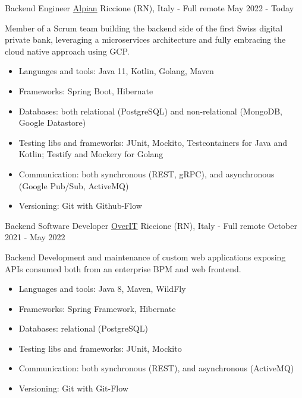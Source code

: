 

\begin{cventries}
	
\cventry
{Backend Engineer} %
{\href{https://alpian.com/}{Alpian}} %
{Riccione (RN), Italy - Full remote} %
{May 2022 - Today} %
{
	Member of a Scrum team building the backend side of the first Swiss digital private bank, leveraging a microservices architecture and fully embracing the cloud native approach using GCP.
	\begin{itemize}
		\item {Languages and tools: Java 11, Kotlin, Golang, Maven}
		\item {Frameworks: Spring Boot, Hibernate}
		\item {Databases: both relational (PostgreSQL) and non-relational (MongoDB, Google Datastore)}
		\item {Testing libs and frameworks: JUnit, Mockito, Testcontainers for Java and Kotlin; Testify and Mockery for Golang}
		\item {Communication: both synchronous (REST, gRPC), and asynchronous (Google Pub/Sub, ActiveMQ)}
		\item {Versioning: Git with Github-Flow}
	\end{itemize}
}


\cventry
	{Backend Software Developer} %
	{\href{https://overit.it/en}{OverIT}} %
	{Riccione (RN), Italy - Full remote} %
	{October 2021 - May 2022} %
	{
		Backend Development and maintenance of custom web applications exposing APIs consumed both from an enterprise BPM and web frontend.
		\begin{itemize}
			\item {Languages and tools: Java 8, Maven, WildFly}
			\item {Frameworks: Spring Framework, Hibernate}
			\item {Databases: relational (PostgreSQL)}
			\item {Testing libs and frameworks: JUnit, Mockito}
			\item {Communication: both synchronous (REST), and asynchronous (ActiveMQ)}
			\item {Versioning: Git with Git-Flow}
		\end{itemize}
	}


\end{cventries}
